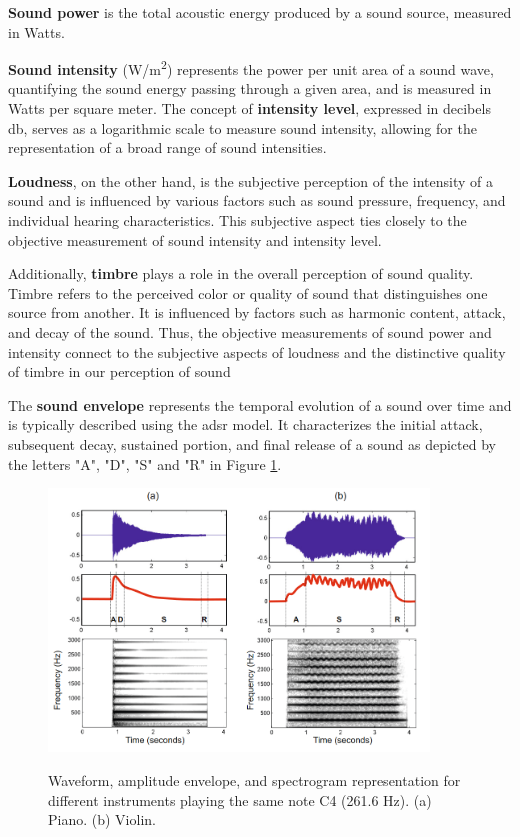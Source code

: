 \textbf{Sound power} is the total acoustic energy produced by a sound source, measured in Watts.

\textbf{Sound intensity} (W/m\textsuperscript{2}) represents the power per unit area of a sound wave, quantifying the sound energy passing through a given area, and is measured in Watts per square meter. The concept of \textbf{intensity level}, expressed in decibels \gls{db}, serves as a logarithmic scale to measure sound intensity, allowing for the representation of a broad range of sound intensities.

\textbf{Loudness}, on the other hand, is the subjective perception of the intensity of a sound and is influenced by various factors such as sound pressure, frequency, and individual hearing characteristics. This subjective aspect ties closely to the objective measurement of sound intensity and intensity level.

Additionally, \textbf{timbre} plays a role in the overall perception of sound quality. Timbre refers to the perceived color or quality of sound that distinguishes one source from another. It is influenced by factors such as harmonic content, attack, and decay of the sound. Thus, the objective measurements of sound power and intensity connect to the subjective aspects of loudness and the distinctive quality of timbre in our perception of sound

The \textbf{sound envelope} represents the temporal evolution of a sound over time and is typically described using the \gls{adsr} model. It characterizes the initial attack, subsequent decay, sustained portion, and final release of a sound as depicted by the letters "A", "D", "S" and "R" in Figure \ref{fig:frmwk_audio_fund_adsr}.

\begin{figure}[htbp]
    \raggedright
        \caption{Waveform, amplitude envelope, and spectrogram representation for different instruments playing the same note C4 (261.6 Hz). (a) Piano. (b) Violin.}
        \includegraphics[width=0.9\textwidth]{resources/images/030-theoretical_framework/Framework_audio_fund_ADSR.png}
        \label{fig:frmwk_audio_fund_adsr}
\end{figure}

